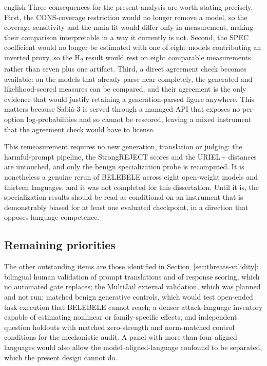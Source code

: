 \begin{otherlanguage*}{english}
Three consequences for the present analysis are worth stating precisely. First, the CONS-coverage restriction would no longer remove a model, so the coverage sensitivity and the main fit would differ only in measurement, making their comparison interpretable in a way it currently is not. Second, the SPEC coefficient would no longer be estimated with one of eight models contributing an inverted proxy, so the H\textsubscript{2} result would rest on eight comparable measurements rather than seven plus one artifact. Third, a direct agreement check becomes available: on the models that already parse near completely, the generated and likelihood-scored measures can be compared, and their agreement is the only evidence that would justify retaining a generation-parsed figure anywhere. This matters because Sabi\'a-3 is served through a managed API that exposes no per-option log-probabilities and so cannot be rescored, leaving a mixed instrument that the agreement check would have to license.

This remeasurement requires no new generation, translation or judging: the harmful-prompt pipeline, the StrongREJECT scores and the URIEL+ distances are untouched, and only the benign specialization probe is recomputed. It is nonetheless a genuine rerun of BELEBELE across eight open-weight models and thirteen languages, and it was not completed for this dissertation. Until it is, the specialization results should be read as conditional on an instrument that is demonstrably biased for at least one evaluated checkpoint, in a direction that opposes language competence.

\subsection{Remaining priorities}

The other outstanding items are those identified in Section~\ref{sec:threats-validity}: bilingual human validation of prompt translations and of response scoring, which no automated gate replaces; the MultiJail external validation, which was planned and not run; matched benign generative controls, which would test open-ended task execution that BELEBELE cannot reach; a denser attack-language inventory capable of estimating nonlinear or family-specific effects; and independent question holdouts with matched zero-strength and norm-matched control conditions for the mechanistic audit. A panel with more than four aligned languages would also allow the model--aligned-language confound to be separated, which the present design cannot do.


\end{otherlanguage*}
